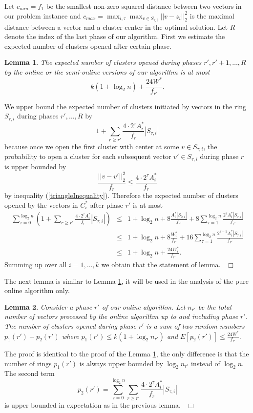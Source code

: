 \documentclass{article}
\newtheorem{lemma}{Lemma}
\newenvironment{proof}{\medskip\noindent {\bf Proof.}}{~\hfill$\Box$\medskip}
\begin{document}
Let $c_{min}=f_1$ be the smallest non-zero squared distance between two vectors in our problem instance  and $c_{max}=\max_{i,\tau}\max_{v\in S_{\tau,i}} ||v-z_i||^2_2$ is the maximal distance between a vector and a cluster center in the optimal solution. Let $R$ denote the index of the last phase of our algorithm.
First we estimate the expected number of clusters opened after certain phase.
\begin{lemma}\label{expected}
The expected number of clusters opened during phases $r',r'+1,\dots,R$  by the online or the semi-online versions of our algorithm is at most
$$k(1+\log_2n) +\frac{24W^*}{f_{r'}}.$$ 
\end{lemma}
\begin{proof}
We upper bound the expected number of clusters initiated by vectors in the ring $S_{\tau,i}$ during phases $r',\dots,R$ by 
$$1+\sum_{r\ge r'}\frac{4\cdot 2^{\tau}A^*_i}{f_r}|S_{\tau,i}|$$
because once we open the first cluster with center at some   $v\in S_{\tau,i}$, the probability to open a cluster for each subsequent vector  $v'\in S_{\tau,i}$ during phase $r$ is upper bounded by 
$$\frac{||v-v'||^2_2}{f_r}\le \frac{4\cdot 2^{\tau}A^*_i}{f_r}$$
 by inequality (\ref{triangleInequality}).
Therefore the expected number of clusters opened by the vectors in $C^*_i$ after phase $r'$ is at most
\begin{eqnarray*}
\sum_{\tau=0}^{\log_2 n}\left(1+\sum_{r\ge r'}\frac{4\cdot 2^{\tau} A^*_i}{f_r}|S_{\tau,i}|\right)&\le &1+\log_2 n+8\frac{A^*_i|S_{0,i}|}{f_{r'}}+8\sum_{\tau=1}^{\log_2 n} \frac{2^{\tau}A^*_i|S_{\tau,i}|}{f_{r'}}\\
&\le &1+\log_2 n+8\frac{W^*_i}{f_{r'}}+16\sum_{\tau=1}^{\log_2 n} \frac{2^{\tau-1}A^*_i|S_{\tau,i}|}{f_{r'}}\\
&\le&1+ \log_2 n +\frac{24W^*_i}{f_{r'}}.
\end{eqnarray*}
Summing up over all $i=1,\dots, k$ we obtain that the statement of lemma.
\end{proof}

The next lemma is similar to Lemma \ref{expected}, it will be used in the analysis of the pure online algorithm only.
\begin{lemma}\label{expected1}
Consider a phase $r'$ of our online algorithm. Let $n_{r'}$ be the total number of vectors processed by the online algorithm up to and including phase $r'$. The  number of clusters opened during phase $r'$ is a sum of two random numbers $p_1(r')+p_2(r')$ where $p_1(r')\le k(1+\log_2n_{r'})$ and $E[p_2(r')]\le \frac{24W^*}{f_{r'}}.$
\end{lemma}
\begin{proof}
The proof is identical to the proof of the Lemma \ref{expected}, the only difference is that the number of rings $p_1(r')$ is always upper bounded by $ \log_2n_{r'}$ instead of $\log_2n$. The second term 
$$p_2(r')= \sum_{\tau=0}^{\log_2 n}\sum_{r\ge r'}\frac{4\cdot 2^{\tau} A^*_i}{f_r}|S_{\tau,i}|$$
 is upper bounded in expectation as in the previous lemma.
\end{proof}
\end{document}
